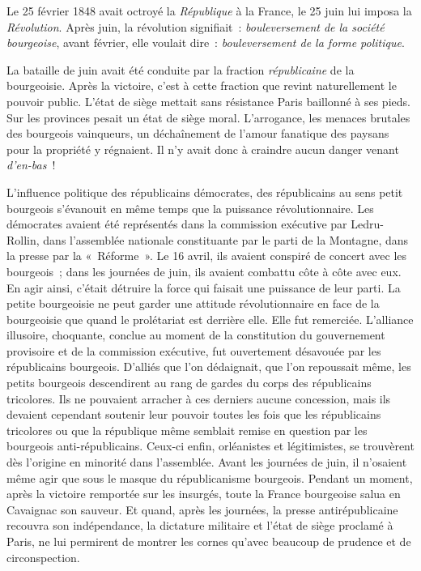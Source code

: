 \documentclass[twoside]{book} %
\newcommand\chaptercont{} %
\begin{document}
\chaptercont
\noindent Le 25 février 1848 avait octroyé la \emph{République} à la France, le 25 juin lui imposa la \emph{Révolution}. Après juin, la révolution signifiait : \emph{bouleversement de la société bourgeoise}, avant février, elle voulait dire : \emph{bouleversement de la forme politique}.\par
La bataille de juin avait été conduite par la fraction \emph{républicaine} de la bourgeoisie. Après la victoire, c’est à cette fraction que revint naturellement le pouvoir public. L’état de siège mettait sans résistance Paris baillonné à ses pieds. Sur les provinces pesait un état de siège moral. L’arrogance, les menaces brutales des bourgeois vainqueurs, un déchaînement de l’amour fanatique des paysans pour la propriété y régnaient. Il n’y avait donc à craindre aucun danger venant \emph{d’en-bas} !\par
L’influence politique des républicains démocrates, des républicains au sens petit bourgeois s’évanouit en même temps que la puissance révolutionnaire. Les démocrates avaient été représentés dans la commission exécutive par Ledru-Rollin, dans l’assemblée nationale constituante par le parti de la Montagne, dans la presse par la « Réforme ». Le 16 avril, ils avaient conspiré de concert avec les bourgeois ; dans les journées de juin, ils avaient combattu côte à côte avec eux. En agir ainsi, c’était détruire la force qui faisait une puissance de leur parti. La petite bourgeoisie ne peut garder une attitude révolutionnaire en face de la bourgeoisie que quand le prolétariat est derrière elle. Elle fut remerciée. L’alliance illusoire, choquante, conclue au moment de la constitution du gouvernement provisoire et de la commission exécutive, fut ouvertement désavouée par les républicains bourgeois. D’alliés que l’on dédaignait, que l’on repoussait même, les petits bourgeois descendirent au rang de gardes du corps des républicains tricolores. Ils ne pouvaient arracher à ces derniers aucune concession, mais ils devaient cependant soutenir leur pouvoir toutes les fois que les républicains tricolores ou que la république même semblait remise en question par les bourgeois anti-républicains. Ceux-ci enfin, orléanistes et légitimistes, se trouvèrent dès l’origine en minorité dans l’assemblée. Avant les journées de juin, il n’osaient même agir que sous le masque du républicanisme bourgeois. Pendant un moment, après la victoire remportée sur les insurgés, toute la France bourgeoise salua en Cavaignac son sauveur. Et quand, après les journées, la presse antirépublicaine recouvra son indépendance, la dictature militaire et l’état de siège proclamé à Paris, ne lui permirent de montrer les cornes qu’avec beaucoup de prudence et de circonspection.\par
\end{document}
